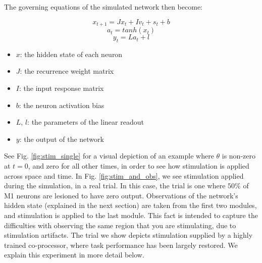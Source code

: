 \documentclass[12pt]{iopart}
\begin{document}
The governing equations of the simulated network then become:

\begin{equation}
x_{t+1} = Jx_{t} + Iv_{t} + s_{t} + b
\end{equation}
\begin{equation}
a_{t} = tanh(x_{t})
\end{equation}
\begin{equation}
y_{t} = La_{t} + l
\end{equation}

\begin{itemize}
	\item $x$: the hidden state of each neuron
	\item $J$: the recurrence weight matrix
	\item $I$: the input response matrix
	\item $b$: the neuron activation bias
	\item $L$, $l$: the parameters of the linear readout
	\item $y$: the output of the network
\end{itemize}

See Fig. \ref{fig:stim_single} for a visual depiction of an example where
$\theta$ is non-zero at $t=0$, and zero for all other times, in order to see how
stimulation is applied across space and time. In Fig. \ref{fig:stim_and_obs},
we see stimulation applied during the simulation, in a real trial. In this case,
the trial is one where $50\%$ of M1 neurons are lesioned to have zero output.
Observations of the network's hidden state (explained in the next section) are taken
from the first two modules, and stimulation is applied to the last module. This fact
is intended to capture the difficulties with observing the same region that you are
stimulating, due to stimulation artifacts. The trial we show depicts stimulation
supplied by a highly trained co-processor, where task performance has been
largely restored. We explain this experiment in more detail below.
\end{document}

